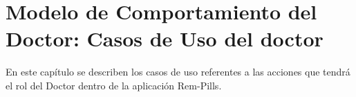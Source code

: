 \newpage
\chapter{Modelo de Comportamiento del Doctor: Casos de Uso del doctor \label{chp:modeloComportamientoDoctor}}

\newpage
En este capítulo se describen los casos de uso referentes a las acciones que tendrá el rol del Doctor dentro de la aplicación Rem-Pills. \bigskip

